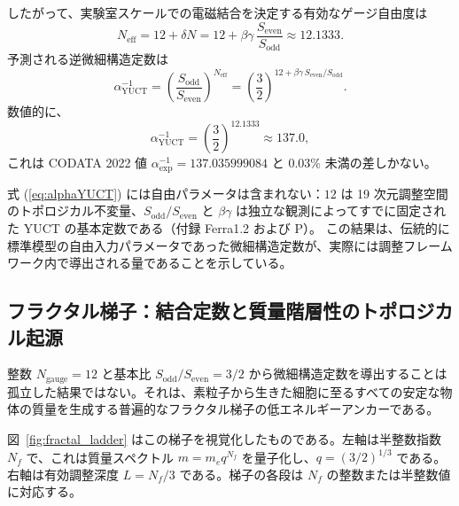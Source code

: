 \documentclass[12pt,a4paper]{article}
\begin{document}
	したがって、実験室スケールでの電磁結合を決定する有効なゲージ自由度は
	\begin{equation}
		N_{\mathrm{eff}} = 12 + \delta N = 12 + \beta\gamma\,\frac{S_{\mathrm{even}}}{S_{\mathrm{odd}}} \approx 12.1333 .
	\end{equation}
	予測される逆微細構造定数は
	\begin{equation}
		\boxed{\alpha^{-1}_{\mathrm{YUCT}} = \left( \frac{S_{\mathrm{odd}}}{S_{\mathrm{even}}} \right)^{N_{\mathrm{eff}}}
			= \left( \frac{3}{2} \right)^{12 + \beta\gamma\,S_{\mathrm{even}}/S_{\mathrm{odd}}} } .
		\label{eq:alphaYUCT}
	\end{equation}
	数値的に、
	\[
	\alpha^{-1}_{\mathrm{YUCT}} = \left( \frac{3}{2} \right)^{12.1333} \approx 137.0 ,
	\]
	これは CODATA 2022 値 \(\alpha^{-1}_{\mathrm{exp}} = 137.035999084\) と \(0.03\%\) 未満の差しかない。
	
	式 (\ref{eq:alphaYUCT}) には自由パラメータは含まれない：\(12\) は 19 次元調整空間のトポロジカル不変量、\(S_{\mathrm{odd}}/S_{\mathrm{even}}\) と \(\beta\gamma\) は独立な観測によってすでに固定された YUCT の基本定数である（付録 Ferra1.2 および P）。  
	この結果は、伝統的に標準模型の自由入力パラメータであった微細構造定数が、実際には調整フレームワーク内で導出される量であることを示している。
	
	\subsection{フラクタル梯子：結合定数と質量階層性のトポロジカル起源}
	\label{sec:fractal_ladder}
	
	整数 \(N_{\mathrm{gauge}}=12\) と基本比 \(S_{\mathrm{odd}}/S_{\mathrm{even}}=3/2\) から微細構造定数を導出することは孤立した結果ではない。それは、素粒子から生きた細胞に至るすべての安定な物体の質量を生成する普遍的なフラクタル梯子の低エネルギーアンカーである。
	
	図~\ref{fig:fractal_ladder} はこの梯子を視覚化したものである。左軸は半整数指数 \(N_f\) で、これは質量スペクトル \(m = m_e q^{N_f}\) を量子化し、\(q = (3/2)^{1/3}\) である。右軸は有効調整深度 \(L = N_f/3\) である。梯子の各段は \(N_f\) の整数または半整数値に対応する。
	
\end{document}

